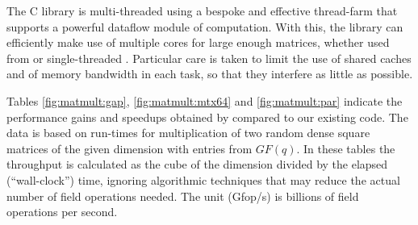 The  C library is multi-threaded using a bespoke and
effective thread-farm that supports a powerful dataflow module of
computation. With this, the library can efficiently make
use of multiple cores for large enough matrices, whether used from
\HPCGAP or single-threaded \GAP. Particular care is taken to limit the use of
shared caches and of memory bandwidth in each task, so that they
interfere as little as possible. 

Tables \ref{fig:matmult:gap}, \ref{fig:matmult:mtx64} and
\ref{fig:matmult:par} indicate the performance gains and
speedups obtained by  compared to our existing code.  The
data is based on run-times for multiplication of two random dense
square matrices of the given dimension with entries from $GF(q)$. In
these tables the throughput is calculated as the cube of the dimension
divided by the elapsed (``wall-clock'') time, ignoring algorithmic
techniques that may reduce the actual number of field operations
needed. The unit (Gfop/s) is billions of field operations per
second. 


